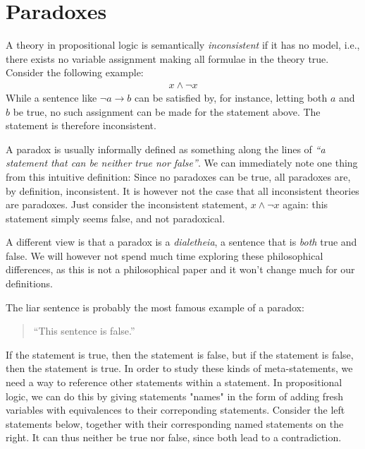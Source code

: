 \section{Paradoxes}
\label{sec:Paradoxes}
A theory in propositional logic is semantically \textit{inconsistent} if it has no model, i.e., there exists no variable assignment making all formulae in the theory true.
Consider the following example:
\begin{align}
  x \wedge \neg x
\end{align}
While a sentence like $\neg a \rightarrow b$ can be satisfied by, for instance, letting both $a$ and $b$ be true, no such assignment can be made for the statement above.
The statement is therefore inconsistent.

A paradox is usually informally defined as something along the lines of \textit{``a statement that can be neither true nor false''}.
We can immediately note one thing from this intuitive definition:
Since no paradoxes can be true, all paradoxes are, by definition, inconsistent.
It is however not the case that all inconsistent theories are paradoxes.
Just consider the inconsistent statement, $x \wedge \neg x$ again: this statement simply seems false, and not paradoxical.

A different view is that a paradox is a \textit{dialetheia}, a sentence that is \textit{both} true and false\cite{sep-dialetheism}. We will however not spend much time exploring these philosophical differences, as this is not a philosophical paper and it won't change much for our definitions.

The liar sentence is probably the most famous example of a paradox:
\begin{quote}
  ``This sentence is false.''
\end{quote}
If the statement is true, then the statement is false, but if the statement is false, then the statement is true.
In order to study these kinds of meta-statements, we need a way to reference other statements within a statement.
In propositional logic, we can do this by giving statements "names" in the form of adding fresh variables with equivalences to their correponding statements.
Consider the left statements below, together with their corresponding named statements on the right.
It can thus neither be true nor false, since both lead to a contradiction.


